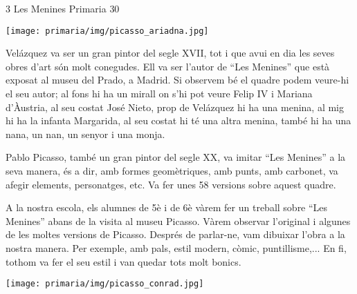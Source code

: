 \begin{news}
{3} %
{Les Menines}
{}
{Primaria}
{30} %

\noindent\texttt{[image: primaria/img/picasso\_ariadna.jpg]}


Velázquez va ser un gran pintor del segle XVII, tot i que avui en dia les seves obres d’art són molt conegudes. Ell
 va ser l’autor de “Les Menines” que està exposat al museu del Prado, a Madrid. Si observem bé el quadre podem veure-hi el seu autor; al fons hi ha un mirall on s’hi pot veure Felip IV i Mariana d’Àustria, al seu costat José Nieto, prop de Velázquez hi ha una menina, al mig hi ha la infanta Margarida, al seu costat hi té una altra menina, també hi ha una nana, un nan, un senyor i una monja. 


Pablo  Picasso, també un gran pintor del segle XX, va imitar  “Les Menines” a la seva
manera, és a dir,  amb formes geomètriques, amb punts, amb carbonet, va afegir elements, personatges, etc. Va fer unes 58 versions sobre aquest quadre. 


A la nostra escola, els alumnes de 5è i de 6è vàrem fer un treball sobre “Les Menines” abans de la visita al museu Picasso.
Vàrem observar l’original i algunes de les moltes versions de Picasso. Després de parlar-ne, vam dibuixar l’obra a la nostra manera. Per exemple, amb pals, estil modern, còmic, puntillisme,...  En fi, tothom  va fer el seu estil i van quedar  tots molt bonics.

\noindent\texttt{[image: primaria/img/picasso\_conrad.jpg]}


\end{news}

\newssep
